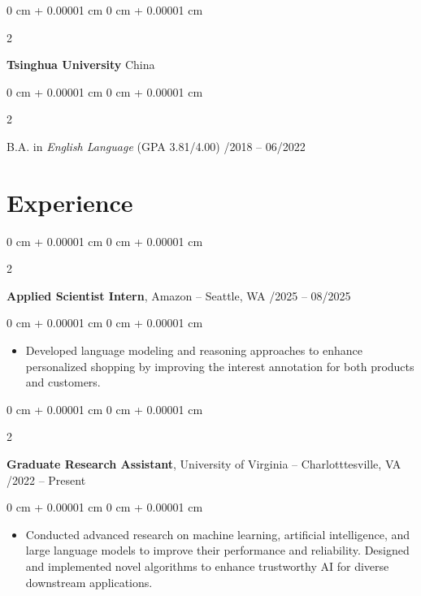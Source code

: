 \documentclass[10pt, letterpaper]{article}
\newenvironment{highlights}{
    \begin{itemize}[
        topsep=0.10 cm,
        parsep=0.10 cm,
        partopsep=0pt,
        itemsep=0pt,
        leftmargin=0 cm + 10pt
    ]
}{
    \end{itemize}
} %
\newenvironment{onecolentry}{
    \begin{adjustwidth}{
        0 cm + 0.00001 cm
    }{
        0 cm + 0.00001 cm
    }
}{
    \end{adjustwidth}
} %
\newenvironment{twocolentry}[2][]{
    \onecolentry
    \def\secondColumn{#2}
    \setcolumnwidth{\fill, 4.5 cm}
    \begin{paracol}{2}
}{
    \switchcolumn \raggedleft \secondColumn
    \end{paracol}
    \endonecolentry
} %
\begin{document}


        
        \vspace{0.10 cm}
        \begin{twocolentry}{
            China
        }
            \textbf{Tsinghua University}\end{twocolentry}

        \vspace{0.10 cm}
        \begin{twocolentry}{
            09/2018 – 06/2022
        }
            B.A. in \textit{English Language} (GPA 3.81/4.00)\end{twocolentry}

    
    \section{Experience}
        
        \begin{twocolentry}{
            05/2025 – 08/2025
        }
            \textbf{Applied Scientist Intern}, Amazon -- Seattle, WA\end{twocolentry}

        \vspace{0.10 cm}
        \begin{onecolentry}
            \begin{highlights}
                \item Developed language modeling and reasoning approaches to enhance personalized shopping by improving the interest annotation for both products and customers.
            \end{highlights}
        \end{onecolentry}


        \vspace{0.2 cm}

        \begin{twocolentry}{
            08/2022 – Present
        }
            \textbf{Graduate Research Assistant}, University of Virginia -- Charlotttesville, VA\end{twocolentry}

        \vspace{0.10 cm}
        \begin{onecolentry}
            \begin{highlights}
                \item Conducted advanced research on machine learning, artificial intelligence, and large language models to improve their performance and reliability. Designed and implemented novel algorithms to enhance trustworthy AI for diverse downstream applications.
            \end{highlights}
        \end{onecolentry}
\end{document}
